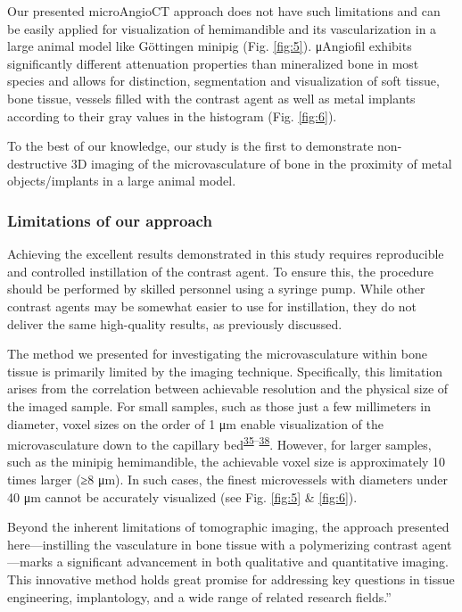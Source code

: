 Our presented microAngioCT approach does not have such limitations and can be easily applied for visualization of hemimandible and its vascularization in a large animal model like Göttingen minipig (Fig. \ref{fig:5}).
μAngiofil exhibits significantly different attenuation properties than mineralized bone in most species and allows for distinction, segmentation and visualization of soft tissue, bone tissue, vessels filled with the contrast agent as well as metal implants according to their gray values in the histogram (Fig. \ref{fig:6}).

To the best of our knowledge, our study is the first to demonstrate non-destructive 3D imaging of the microvasculature of bone in the proximity of metal objects/implants in a large animal model.

\hypertarget{limitations-of-our-approach}{%
\subsubsection{Limitations of our approach}\label{limitations-of-our-approach}}

Achieving the excellent results demonstrated in this study requires reproducible and controlled instillation of the contrast agent.
To ensure this, the procedure should be performed by skilled personnel using a syringe pump.
While other contrast agents may be somewhat easier to use for instillation, they do not deliver the same high-quality results, as previously discussed.

The method we presented for investigating the microvasculature within bone tissue is primarily limited by the imaging technique.
Specifically, this limitation arises from the correlation between achievable resolution and the physical size of the imaged sample.
For small samples, such as those just a few millimeters in diameter, voxel sizes on the order of 1 μm enable visualization of the microvasculature down to the capillary bed\textsuperscript{\protect\hyperlink{ref-s9aC9H1e}{35}--\protect\hyperlink{ref-iM9i6gkJ}{38}}.
However, for larger samples, such as the minipig hemimandible, the achievable voxel size is approximately 10 times larger (≥8 μm).
In such cases, the finest microvessels with diameters under 40 μm cannot be accurately visualized (see Fig. \ref{fig:5} \& \ref{fig:6}).

Beyond the inherent limitations of tomographic imaging, the approach presented here---instilling the vasculature in bone tissue with a polymerizing contrast agent---marks a significant advancement in both qualitative and quantitative imaging.
This innovative method holds great promise for addressing key questions in tissue engineering, implantology, and a wide range of related research fields.''

